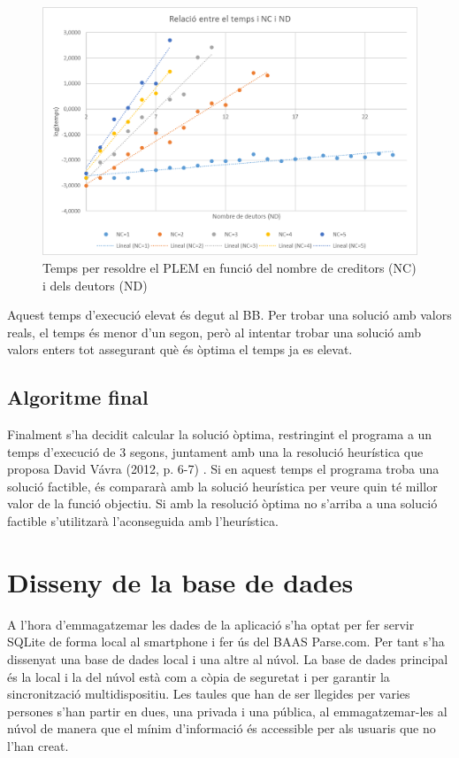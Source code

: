 
\begin{figure}[ht]
\centering
\includegraphics[scale=0.8]{PLEM_temps_3.png}
\caption{Temps per resoldre el PLEM en funció del nombre de creditors (NC) i dels deutors (ND)}\label{fig:PLEM_3}
\end{figure}

Aquest temps d'execució elevat és degut al \gls{BB}. Per trobar una solució amb valors reals, el temps és menor d'un segon, però al intentar trobar una solució amb valors enters tot assegurant què és òptima el temps ja es elevat.

\subsection{Algoritme final}
Finalment s'ha decidit calcular la solució òptima, restringint el programa a un temps d'execució de 3 segons, juntament amb una la resolució heurística que proposa David Vávra (2012, p. 6-7) \cite{Settle_up}. Si en aquest temps el programa troba una solució factible, és compararà amb la solució heurística per veure quin té millor valor de la funció objectiu. Si amb la resolució òptima no s'arriba a una solució factible s'utilitzarà l'aconseguida amb l'heurística. 

\section{Disseny de la base de dades}
A l'hora d'emmagatzemar les dades de la aplicació s'ha optat per fer servir \gls{SQLite} de forma local al \gls{smartphone} i fer ús del \gls{BAAS} Parse.com. Per tant s'ha dissenyat una base de dades local i una altre al núvol. La base de dades principal és la local i la del núvol està com a còpia de seguretat i per garantir la sincronització multidispositiu. Les taules que han de ser llegides per varies persones s'han partir en dues, una privada i una pública, al emmagatzemar-les al núvol de manera que el mínim d'informació és accessible per als usuaris que no l'han creat.


